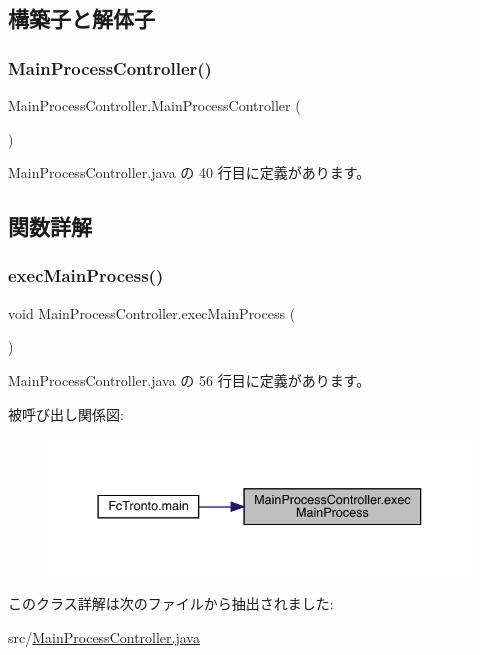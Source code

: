 \subsection{構築子と解体子}
\mbox{\label{class_main_process_controller_af422b069cc9f6cadb45a64ef985bd536}} 
\subsubsection{\texorpdfstring{MainProcessController()}{MainProcessController()}}
{\footnotesize\ttfamily Main\+Process\+Controller.\+Main\+Process\+Controller (\begin{DoxyParamCaption}{ }\end{DoxyParamCaption})\hspace{0.3cm}{\ttfamily [inline]}}



 Main\+Process\+Controller.\+java の 40 行目に定義があります。



\subsection{関数詳解}
\mbox{\label{class_main_process_controller_ac92bd6b23aa4c17913d6a9c63ee72739}} 
\subsubsection{\texorpdfstring{execMainProcess()}{execMainProcess()}}
{\footnotesize\ttfamily void Main\+Process\+Controller.\+exec\+Main\+Process (\begin{DoxyParamCaption}{ }\end{DoxyParamCaption})\hspace{0.3cm}{\ttfamily [inline]}}



 Main\+Process\+Controller.\+java の 56 行目に定義があります。

被呼び出し関係図\+:\nopagebreak
\begin{figure}[H]
\begin{center}
\leavevmode
\includegraphics[width=337pt]{d2/d71/class_main_process_controller_ac92bd6b23aa4c17913d6a9c63ee72739_icgraph}
\end{center}
\end{figure}


このクラス詳解は次のファイルから抽出されました\+:\begin{DoxyCompactItemize}
\item 
src/\mbox{\hyperlink{_main_process_controller_8java}{Main\+Process\+Controller.\+java}}\end{DoxyCompactItemize}
